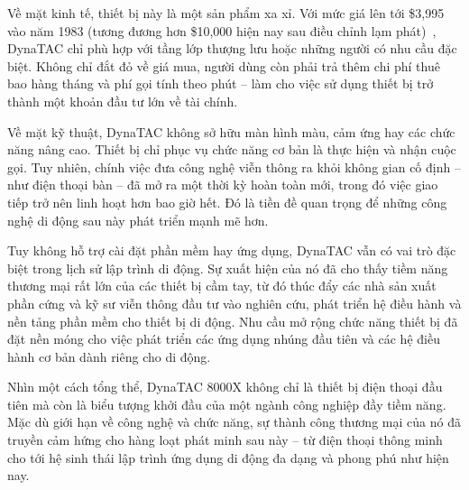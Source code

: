 \begin{flushleft}
  \hspace*{0.8cm}Về mặt kinh tế, thiết bị này là một sản phẩm xa xỉ. Với mức giá lên tới \$3,995 vào năm 1983 (tương đương hơn \$10,000 hiện nay sau điều chỉnh lạm phát)~\cite{dynatacprice}, DynaTAC chỉ phù hợp với tầng lớp thượng lưu hoặc những người có nhu cầu đặc biệt. Không chỉ đắt đỏ về giá mua, người dùng còn phải trả thêm chi phí thuê bao hàng tháng và phí gọi tính theo phút – làm cho việc sử dụng thiết bị trở thành một khoản đầu tư lớn về tài chính.
\end{flushleft}

\begin{flushleft}
  \hspace*{0.8cm}Về mặt kỹ thuật, DynaTAC không sở hữu màn hình màu, cảm ứng hay các chức năng nâng cao. Thiết bị chỉ phục vụ chức năng cơ bản là thực hiện và nhận cuộc gọi. Tuy nhiên, chính việc đưa công nghệ viễn thông ra khỏi không gian cố định – như điện thoại bàn – đã mở ra một thời kỳ hoàn toàn mới, trong đó việc giao tiếp trở nên linh hoạt hơn bao giờ hết. Đó là tiền đề quan trọng để những công nghệ di động sau này phát triển mạnh mẽ hơn.
\end{flushleft}

\begin{flushleft}
  \hspace*{0.8cm}Tuy không hỗ trợ cài đặt phần mềm hay ứng dụng, DynaTAC vẫn có vai trò đặc biệt trong lịch sử lập trình di động. Sự xuất hiện của nó đã cho thấy tiềm năng thương mại rất lớn của các thiết bị cầm tay, từ đó thúc đẩy các nhà sản xuất phần cứng và kỹ sư viễn thông đầu tư vào nghiên cứu, phát triển hệ điều hành và nền tảng phần mềm cho thiết bị di động. Nhu cầu mở rộng chức năng thiết bị đã đặt nền móng cho việc phát triển các ứng dụng nhúng đầu tiên và các hệ điều hành cơ bản dành riêng cho di động.
\end{flushleft}

\begin{flushleft}
  \hspace*{0.8cm}Nhìn một cách tổng thể, DynaTAC 8000X không chỉ là thiết bị điện thoại đầu tiên mà còn là biểu tượng khởi đầu của một ngành công nghiệp đầy tiềm năng. Mặc dù giới hạn về công nghệ và chức năng, sự thành công thương mại của nó đã truyền cảm hứng cho hàng loạt phát minh sau này – từ điện thoại thông minh cho tới hệ sinh thái lập trình ứng dụng di động đa dạng và phong phú như hiện nay.
\end{flushleft}

